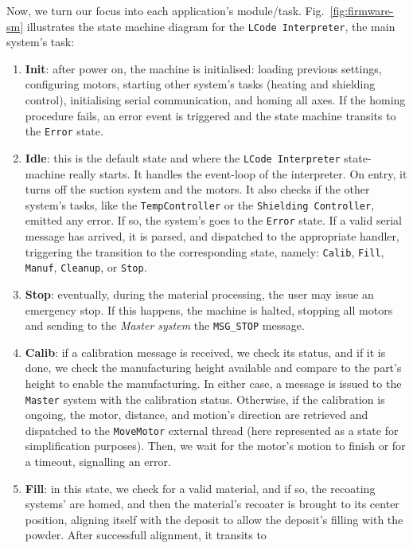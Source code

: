 Now, we turn our focus into each application's module/task.
Fig.~\ref{fig:firmware-sm} illustrates the state machine diagram for the
\texttt{LCode Interpreter}, the main system's task:
\begin{enumerate}
\item \textbf{Init}: after power on, the machine is initialised: loading
  previous settings, configuring motors, starting other system's tasks (heating
  and shielding control), initialising serial communication, and homing all
  axes. If the homing procedure fails, an error event is triggered and the state
  machine transits to the \texttt{Error} state.
\item \textbf{Idle}: this is the default state and where the \texttt{LCode
    Interpreter} state-machine really starts. It handles the event-loop of the
  interpreter. On entry, it turns off the suction system and the motors. It also
  checks if the other system's tasks, like the \texttt{TempController} or the
  \texttt{Shielding Controller}, emitted any error. If so, the system's goes to
  the \texttt{Error} state.
  If a valid serial message has arrived, it is parsed, and dispatched to the
  appropriate handler, triggering the transition to the corresponding state,
  namely: \texttt{Calib}, \texttt{Fill}, \texttt{Manuf}, \texttt{Cleanup}, or \texttt{Stop}.
\item \textbf{Stop}: eventually, during the material processing, the user may
  issue an emergency stop. If this happens, the machine is halted, stopping all
  motors and sending to the \emph{Master system} the \texttt{MSG\_STOP}
  message.
\item \textbf{Calib}: if a calibration message is received, we check its status,
  and if it is done, we check the manufacturing height available and compare to
  the part's height to enable the manufacturing. In either case, a message is
  issued to the \texttt{Master} system with the calibration status. Otherwise,
  if the calibration is ongoing, the motor, distance, and motion's direction are
  retrieved and dispatched to the \texttt{MoveMotor} external thread (here
  represented as a state for simplification purposes). Then, we wait for the
  motor's motion to finish or for a timeout, signalling an error.
\item \textbf{Fill}: in this state, we check for a valid material, and if so,
  the recoating systems' are homed, and then the material's recoater is brought
  to its center position, aligning itself with the deposit to allow the
  deposit's filling with the powder. After successfull alignment, it transits to

\end{enumerate}
